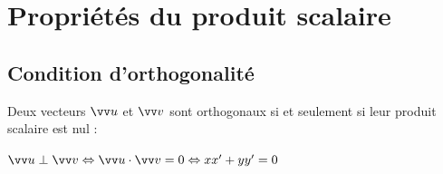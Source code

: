\documentclass[a4paper,11pt]{article}
\begin{document}
%
%
%
%
%
%

\setcounter{section}{3}

\section{Propriétés du produit scalaire}

\subsection{Condition d'orthogonalité}

\begin{cthm}
Deux vecteurs $\vect{u}$ et $\vect{v}$ sont orthogonaux si et seulement si leur produit scalaire est nul :

\hfill$ \vect{u} \perp \vect{v} \ssi \vect{u} \cdot\vect{v}=0 \ssi xx'+yy'=0$\hfill~
\end{cthm}
\end{document}
